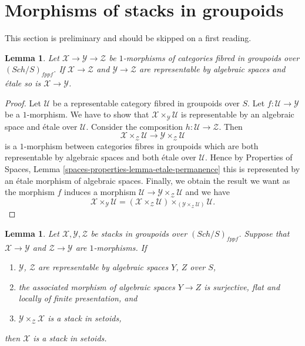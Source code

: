 \documentclass{stacks-project}
\theoremstyle{plain}
\newtheorem{lemma}[subsection]{Lemma}
\theoremstyle{definition}
\theoremstyle{remark}
\numberwithin{equation}{subsection}
\def\Sch{\mathit{Sch}}
\begin{document}
\section{Morphisms of stacks in groupoids}
\label{section-1-morphisms}

\noindent
This section is preliminary and should be skipped on a first reading.

\begin{lemma}
\label{lemma-etale-permanence}
Let $\mathcal{X} \to \mathcal{Y} \to \mathcal{Z}$
be $1$-morphisms of categories fibred in groupoids over
$(\Sch/S)_{fppf}$.
If $\mathcal{X} \to \mathcal{Z}$ and $\mathcal{Y} \to \mathcal{Z}$ are
representable by algebraic spaces and \'etale so is
$\mathcal{X} \to \mathcal{Y}$.
\end{lemma}

\begin{proof}
Let $\mathcal{U}$ be a representable category fibred in groupoids over $S$.
Let $f : \mathcal{U} \to \mathcal{Y}$ be a $1$-morphism. We have to show that
$\mathcal{X} \times_\mathcal{Y} \mathcal{U}$ is representable by an
algebraic space and \'etale over $\mathcal{U}$.
Consider the composition $h : \mathcal{U} \to \mathcal{Z}$. Then
$$
\mathcal{X} \times_\mathcal{Z} \mathcal{U}
\longrightarrow
\mathcal{Y} \times_\mathcal{Z} \mathcal{U}
$$
is a $1$-morphism between categories fibres in groupoids which are both
representable by algebraic spaces and both \'etale over $\mathcal{U}$.
Hence by
Properties of Spaces, Lemma \ref{spaces-properties-lemma-etale-permanence}
this is represented by an \'etale morphism of algebraic spaces.
Finally, we obtain the result we want as the morphism $f$ induces
a morphism $\mathcal{U} \to \mathcal{Y} \times_\mathcal{Z} \mathcal{U}$
and we have
$$
\mathcal{X} \times_\mathcal{Y} \mathcal{U} =
(\mathcal{X} \times_\mathcal{Z} \mathcal{U})
\times_{(\mathcal{Y} \times_\mathcal{Z} \mathcal{U})}
\mathcal{U}.
$$
\end{proof}

\begin{lemma}
\label{lemma-stack-in-setoids-descent}
Let $\mathcal{X}, \mathcal{Y}, \mathcal{Z}$ be stacks in groupoids
over $(\Sch/S)_{fppf}$. Suppose that $\mathcal{X} \to \mathcal{Y}$
and $\mathcal{Z} \to \mathcal{Y}$ are $1$-morphisms.
If
\begin{enumerate}
\item $\mathcal{Y}$, $\mathcal{Z}$ are representable by algebraic spaces
$Y$, $Z$ over $S$,
\item the associated morphism of algebraic spaces $Y \to Z$ is surjective,
flat and locally of finite presentation, and
\item $\mathcal{Y} \times_\mathcal{Z} \mathcal{X}$ is a stack in
setoids,
\end{enumerate}
then $\mathcal{X}$ is a stack in setoids.
\end{lemma}
\end{document}
